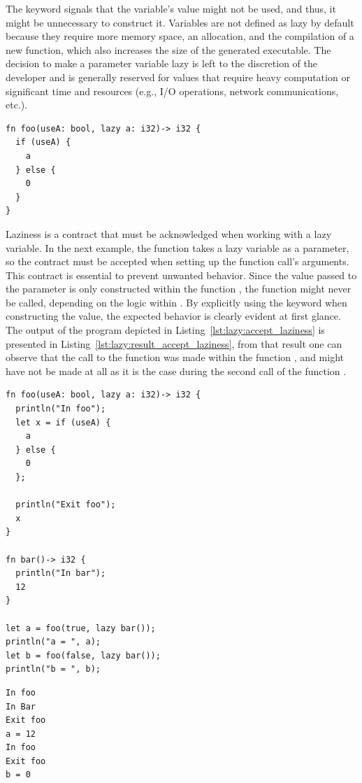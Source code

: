 The keyword  signals that the variable's value might not be used,
and thus, it might be unnecessary to construct it. Variables are not defined as
lazy by default because they require more memory space, an allocation, and the
compilation of a new function, which also increases the size of the generated
executable. The decision to make a parameter variable lazy is left to the
discretion of the developer and is generally reserved for values that require
heavy computation or significant time and resources (e.g., I/O operations,
network communications, etc.).

\begin{lstlisting}[style=coloredverbatim]
fn foo(useA: bool, lazy a: i32)-> i32 {
  if (useA) {
    a
  } else {
    0
  }
}
\end{lstlisting}

Laziness is a contract that must be acknowledged when working with a lazy
variable. In the next example, the function  takes a lazy variable as
a parameter, so the contract must be accepted when setting up the function
call's arguments. This contract is essential to prevent unwanted behavior. Since
the value passed to the parameter  is only constructed within the
function , the function  might never be called, depending
on the logic within . By explicitly using the  keyword
when constructing the value, the expected behavior is clearly evident at first
glance. The output of the program depicted in Listing~\ref{lst:lazy:accept_laziness}
is presented in Listing~\ref{lst:lazy:result_accept_laziness}, from that result one
can observe that the call to the function  was made within the
function , and might have not be made at all as it is the case during
the second call of the function .

\begin{lstlisting}[style=coloredverbatim, label=lst:lazy:accept_laziness, caption=Example of laziness contract acceptance]
fn foo(useA: bool, lazy a: i32)-> i32 {
  println("In foo");
  let x = if (useA) {
    a
  } else {
    0
  };

  println("Exit foo");
  x
}

fn bar()-> i32 {
  println("In bar");
  12
}

let a = foo(true, lazy bar());
println("a = ", a);
let b = foo(false, lazy bar());
println("b = ", b);
\end{lstlisting}

\begin{lstlisting}[style=bashVerb, caption=Result of execution of Listing~\ref{lst:lazy:accept_laziness}, label=lst:lazy:result_accept_laziness]
In foo
In Bar
Exit foo
a = 12
In foo
Exit foo
b = 0
\end{lstlisting}

